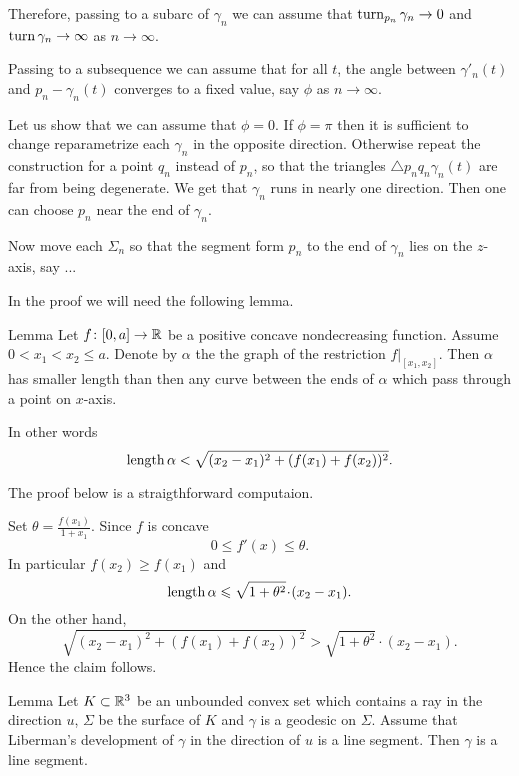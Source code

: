 \documentclass[a4paper,10pt]{amsart}
\begin{document}
Therefore, passing to a subarc of $\gamma_n$ we can assume that 
$\mathop{\rm turn}\nolimits_{p_n}\gamma_n\to0$ and $\mathop{\rm turn}\nolimits\gamma_n\to\infty$ as $n\to\infty$.

Passing to a subsequence we can assume that for all $t$, 
the angle between $\gamma'_n(t)$ and $p_n-\gamma_n(t)$ 
converges to a fixed value, 
say $\phi$ 
as $n\to \infty$.

Let us show that we can assume that $\phi=0$.
If $\phi=\pi$ then it is sufficient to change reparametrize each $\gamma_n$ in the opposite direction.
Otherwise repeat the construction for a point $q_n$ instead of $p_n$, 
so that the triangles $\triangle p_nq_n\gamma_n(t)$ are far from being degenerate.
We get that $\gamma_n$ runs in nearly one direction.
Then one can choose $p_n$ near the end of $\gamma_n$.

Now move each $\Sigma_n$ so that the segment form $p_n$ to the end of $\gamma_n$ lies on the $z$-axis,
say ...


\qeds



In the proof we will need the following lemma.

\begin{thm}{Lemma}\label{lem:1}
Let $f\colon[0,a]\to\mathbb{R}$ be a positive concave nondecreasing function.
Assume  $0<x_1<x_2\le a$.
Denote by $\alpha$ the the graph of the restriction $f|_{[x_1,x_2]}$.
Then $\alpha$ has smaller length than then any curve between the ends of $\alpha$ which pass through a point on $x$-axis.

In other words 
\[\mathop{\rm length}\nolimits\alpha<\sqrt{(x_2-x_1)^2+(f(x_1)+f(x_2))^2}.\]

\end{thm}

The proof below is a straigthforward computaion.

Set $\theta= \frac{f(x_1)}{1+x_1}$.
Since $f$ is concave 
\[0\le f'(x)\le \theta.\]
In particular $f(x_2)\ge f(x_1)$ 
and 
\[\length\alpha\le \sqrt{1+\theta^2}\cdot(x_2-x_1).\]
On the other hand, 
\[\sqrt{(x_2-x_1)^2+(f(x_1)+f(x_2))^2}>\sqrt{1+\theta^2}\cdot(x_2-x_1).\]
Hence the claim follows.
\qeds

\begin{thm}{Lemma}\label{lem:2}
Let $K\subset \mathbb{R}^3$ 
be an unbounded convex set which contains a ray in the direction $u$,
$\Sigma$ be the surface of $K$ 
and
$\gamma$ is a geodesic on $\Sigma$.
Assume that Liberman's development of $\gamma$ in the direction of $u$ is a line segment.
Then $\gamma$ is a line segment.
\end{thm}
\end{document}
